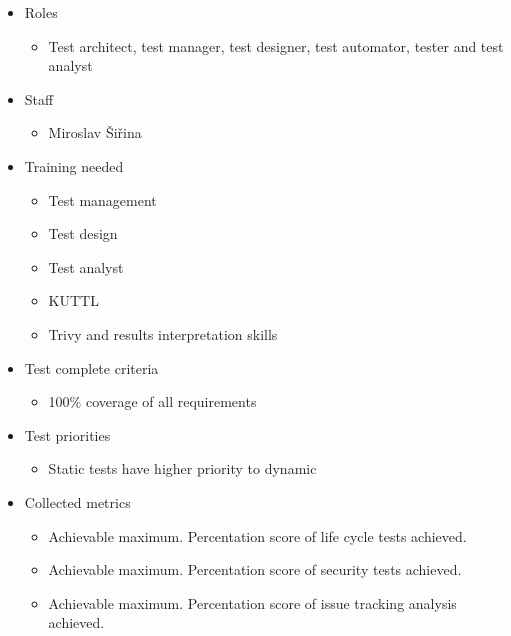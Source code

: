\begin{itemize}
  \item Roles
        \begin{itemize}
          \item Test architect, test manager, test designer, test automator, tester and test analyst
        \end{itemize}

  \item Staff
        \begin{itemize}
          \item Miroslav Šiřina
        \end{itemize}

  \item Training needed
        \begin{itemize}
          \item	Test management
          \item	Test design
          \item	Test analyst
          \item	KUTTL
          \item	Trivy and results interpretation skills
        \end{itemize}

  \item Test complete criteria
        \begin{itemize}
          \item 100\% coverage of all requirements
        \end{itemize}

  \item Test priorities
        \begin{itemize}
          \item Static tests have higher priority to dynamic
        \end{itemize}

  \item Collected metrics
        \begin{itemize}
          \item Achievable maximum. Percentation score of life cycle tests achieved.
          \item Achievable maximum. Percentation score of security tests achieved.
          \item Achievable maximum. Percentation score of issue tracking analysis achieved.
        \end{itemize}
\end{itemize}








